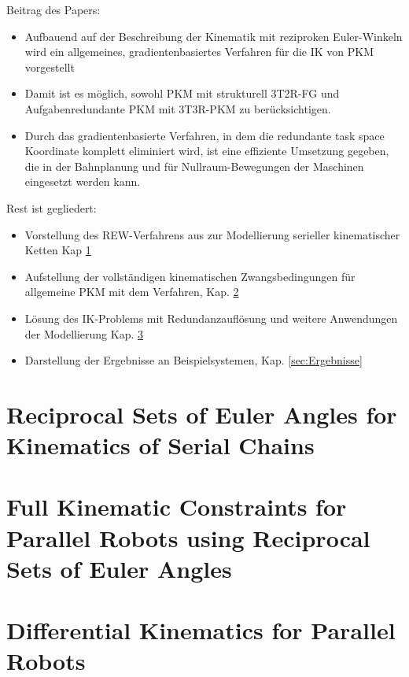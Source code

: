 \documentclass[robotics,article,submit,moreauthors,pdftex]{Definitions/mdpi}
\begin{document}
Beitrag des Papers:
\begin{itemize}
	\item Aufbauend auf der Beschreibung der Kinematik mit reziproken Euler-Winkeln \cite{1_SchapplerTapOrt2019} wird ein allgemeines, gradientenbasiertes Verfahren für die IK von PKM vorgestellt
	\item Damit ist es möglich, sowohl PKM mit strukturell 3T2R-FG und Aufgabenredundante PKM mit 3T3R-PKM zu berücksichtigen.
	\item Durch das gradientenbasierte Verfahren, in dem die redundante task space Koordinate komplett eliminiert wird, ist eine effiziente Umsetzung gegeben, die in der Bahnplanung und für Nullraum-Bewegungen der Maschinen eingesetzt werden kann.
\end{itemize}

Rest ist gegliedert:

\begin{itemize}
	\item Vorstellung des REW-Verfahrens aus \cite{1_SchapplerTapOrt2019} zur Modellierung serieller kinematischer Ketten Kap \ref{sec:REW_seriell}
	\item Aufstellung der vollständigen kinematischen Zwangsbedingungen für allgemeine PKM mit dem Verfahren, Kap. \ref{sec:ZB_PKM}
	\item Lösung des IK-Problems mit Redundanzauflösung und weitere Anwendungen der Modellierung Kap. \ref{sec:ZB_Anwendung}
	\item Darstellung der Ergebnisse an Beispielsystemen, Kap. \ref{sec:Ergebnisse}
\end{itemize}

\section{Reciprocal Sets of Euler Angles for Kinematics of Serial Chains}
\label{sec:REW_seriell}

\cite{Gogu2008}
\cite{Merlet2006}
\cite{1_SchapplerTapOrt2019}

\section{Full Kinematic Constraints for Parallel Robots using Reciprocal Sets of Euler Angles}
\label{sec:ZB_PKM}


\section{Differential Kinematics for Parallel Robots}
\label{sec:ZB_Anwendung}
\end{document}
